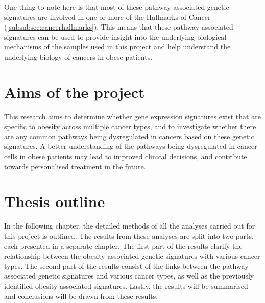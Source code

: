 One thing to note here is that most of these pathway associated genetic signatures are involved in one or more of the Hallmarks of Cancer (\cref{subsubsec:cancerhallmarks}).
This means that these pathway associated signatures can be used to provide insight into the underlying biological mechanisms of the samples used in this project and help understand the underlying biology of cancers in obese patients.

\vspace{-2mm}

\section{Aims of the project}
\label{sec:aim}

This research aims to determine whether gene expression signatures exist  that are specific to obesity across multiple cancer types, and to investigate whether there are any common pathways being dysregulated in cancers based on these genetic signatures.
A better understanding of the pathways being dysregulated in cancer cells in obese patients may lead to improved clinical decisions, and contribute towards personalised treatment in the future.

\section{Thesis outline}
\label{sec:thesis_outline}

In the following chapter, the detailed methods of all the analyses carried out for this project is outlined.
The results from these analyses are split into two parts, each presented in a separate chapter.
The first part of the results clarify the relationship between the obesity associated genetic signatures with various cancer types.
The second part of the results consist of the links between the pathway associated genetic signatures and various cancer types, as well as the previously identified obesity associated signatures.
Lastly, the results will be summarised and conclusions will be drawn from these results.
